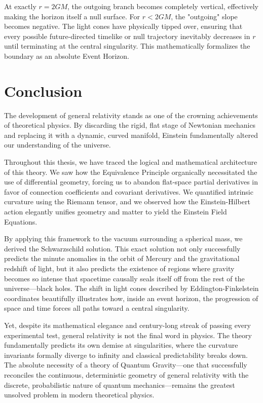 \documentclass[11pt, a4paper]{report}
\begin{document}
At exactly $r=2GM$, the outgoing branch becomes completely vertical, effectively making the horizon itself a null surface. For $r<2GM$, the "outgoing" slope becomes negative. The light cones have physically tipped over, ensuring that every possible future-directed timelike or null trajectory inevitably decreases in $r$ until terminating at the central singularity. This mathematically formalizes the boundary as an absolute Event Horizon.


\chapter{Conclusion}

The development of general relativity stands as one of the crowning achievements of theoretical physics. By discarding the rigid, flat stage of Newtonian mechanics and replacing it with a dynamic, curved manifold, Einstein fundamentally altered our understanding of the universe. 
\newline

Throughout this thesis, we have traced the logical and mathematical architecture of this theory. We saw how the Equivalence Principle organically necessitated the use of differential geometry, forcing us to abandon flat-space partial derivatives in favor of connection coefficients and covariant derivatives. We quantified intrinsic curvature using the Riemann tensor, and we observed how the Einstein-Hilbert action elegantly unifies geometry and matter to yield the Einstein Field Equations. 
\newline

By applying this framework to the vacuum surrounding a spherical mass, we derived the Schwarzschild solution. This exact solution not only successfully predicts the minute anomalies in the orbit of Mercury and the gravitational redshift of light, but it also predicts the existence of regions where gravity becomes so intense that spacetime causally seals itself off from the rest of the universe—black holes. The shift in light cones described by Eddington-Finkelstein coordinates beautifully illustrates how, inside an event horizon, the progression of space and time forces all paths toward a central singularity.
\newline

Yet, despite its mathematical elegance and century-long streak of passing every experimental test, general relativity is not the final word in physics. The theory fundamentally predicts its own demise at singularities, where the curvature invariants formally diverge to infinity and classical predictability breaks down. The absolute necessity of a theory of Quantum Gravity—one that successfully reconciles the continuous, deterministic geometry of general relativity with the discrete, probabilistic nature of quantum mechanics—remains the greatest unsolved problem in modern theoretical physics. 
\newline
\end{document}
